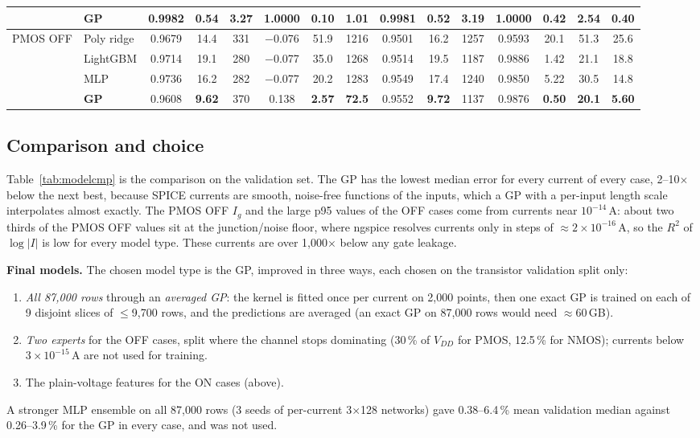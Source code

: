 ﻿\documentclass[conference,10pt]{IEEEtran}
\newcommand{\pct}{\,\%}
\begin{document}
\begin{table}[!t]
\begin{tabular}{@{}ll ccc ccc ccc ccc c@{}}
 & \textbf{GP} & 0.9982 & \textbf{0.54} & \textbf{3.27} & 1.0000 & \textbf{0.10} & \textbf{1.01} & 0.9981 & \textbf{0.52} & \textbf{3.19} & 1.0000 & \textbf{0.42} & \textbf{2.54} & \textbf{0.40}\\
\midrule
PMOS OFF & Poly ridge & 0.9679 & 14.4 & 331 & $-$0.076 & 51.9 & 1216 & 0.9501 & 16.2 & 1257 & 0.9593 & 20.1 & 51.3 & 25.6\\
 & LightGBM & 0.9714 & 19.1 & 280 & $-$0.077 & 35.0 & 1268 & 0.9514 & 19.5 & 1187 & 0.9886 & 1.42 & 21.1 & 18.8\\
 & MLP & 0.9736 & 16.2 & 282 & $-$0.077 & 20.2 & 1283 & 0.9549 & 17.4 & 1240 & 0.9850 & 5.22 & 30.5 & 14.8\\
 & \textbf{GP} & 0.9608 & \textbf{9.62} & 370 & 0.138 & \textbf{2.57} & \textbf{72.5} & 0.9552 & \textbf{9.72} & 1137 & 0.9876 & \textbf{0.50} & \textbf{20.1} & \textbf{5.60}\\
\bottomrule
\end{tabular}
\end{table}

\subsection{Comparison and choice}
Table~\ref{tab:modelcmp} is the comparison on the validation set. The GP has the lowest median
error for every current of every case, 2--10$\times$ below the next best, because SPICE currents
are smooth, noise-free functions of the inputs, which a GP with a per-input length scale
interpolates almost exactly. The PMOS OFF $I_g$ and the large p95 values of the OFF cases come from
currents near $10^{-14}$\,A: about two thirds of the PMOS OFF values sit at the junction/noise
floor, where ngspice resolves currents only in steps of $\approx2\times10^{-16}$\,A, so the $R^2$
of $\log|I|$ is low for every model type. These currents are over 1,000$\times$ below any gate
leakage.

\textbf{Final models.} The chosen model type is the GP, improved in three ways, each chosen on the
transistor validation split only:
\begin{enumerate}
\item \emph{All 87,000 rows} through an \emph{averaged GP}: the kernel is fitted once per current
on 2,000 points, then one exact GP is trained on each of 9 disjoint slices of $\le$9,700 rows, and
the predictions are averaged (an exact GP on 87,000 rows would need $\approx$60\,GB).
\item \emph{Two experts} for the OFF cases, split where the channel stops dominating
(30\pct{} of $V_{DD}$ for PMOS, 12.5\pct{} for NMOS); currents below $3\times10^{-15}$\,A are not
used for training.
\item The plain-voltage features for the ON cases (above).
\end{enumerate}
A stronger MLP ensemble on all 87,000 rows (3 seeds of per-current 3$\times$128 networks) gave
0.38--6.4\pct{} mean validation median against 0.26--3.9\pct{} for the GP in every case, and was
not used.
\end{document}
